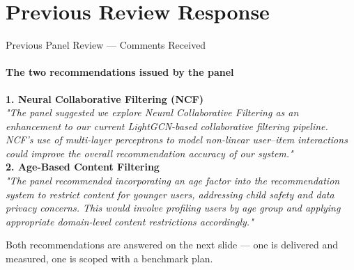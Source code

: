 \documentclass[aspectratio=169, 11pt]{beamer}
\newcommand{\eqs}{%
  \setlength{\abovedisplayskip}{3pt}%
  \setlength{\belowdisplayskip}{3pt}%
  \setlength{\abovedisplayshortskip}{2pt}%
  \setlength{\belowdisplayshortskip}{2pt}}
\begin{document}
\section{Previous Review Response}

\begin{frame}{Previous Panel Review --- Comments Received}
\framesubtitle{The two recommendations issued by the panel}
\vspace{3mm}
\begin{center}
\begin{minipage}{0.94\linewidth}
{\footnotesize\eqs
\textbf{\textcolor{amritaMaroon}{1. Neural Collaborative Filtering (NCF)}}\\[1.2mm]
\textit{"The panel suggested we explore Neural Collaborative Filtering as an enhancement to our
current LightGCN-based collaborative filtering pipeline. NCF's use of multi-layer perceptrons to
model non-linear user--item interactions could improve the overall recommendation accuracy of our
system."}
\\[5mm]
\textbf{\textcolor{amritaMaroon}{2. Age-Based Content Filtering}}\\[1.2mm]
\textit{"The panel recommended incorporating an age factor into the recommendation system to
restrict content for younger users, addressing child safety and data privacy concerns. This would
involve profiling users by age group and applying appropriate domain-level content restrictions
accordingly."}}
\end{minipage}
\end{center}
\vspace{4mm}
{\scriptsize\textcolor{amritaSlate}{Both recommendations are answered on the next slide ---
one is delivered and measured, one is scoped with a benchmark plan.}}
\end{frame}
\end{document}
